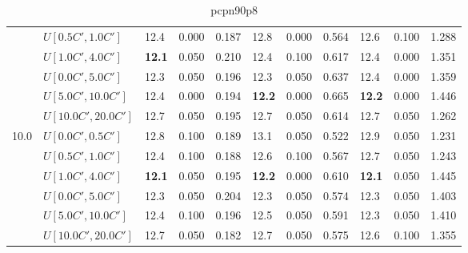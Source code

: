 \begin{table}[h]
{\begin{tabular}{|l|l||l|l|l||l|l|l||l|l|l|}
       & $U[0.5C',1.0C']$ & 12.4 & 0.000 & 0.187 & 12.8 & 0.000 & 0.564 & 12.6 & 0.100 & 1.288 \\
       & $U[1.0C',4.0C']$ & \textbf{12.1} & 0.050 & 0.210 & 12.4 & 0.100 & 0.617 & 12.4 & 0.000 & 1.351 \\
       & $U[0.0C',5.0C']$ & 12.3 & 0.050 & 0.196 & 12.3 & 0.050 & 0.637 & 12.4 & 0.000 & 1.359 \\
       & $U[5.0C',10.0C']$ & 12.4 & 0.000 & 0.194 & \textbf{12.2} & 0.000 & 0.665 & \textbf{12.2} & 0.000 & 1.446 \\
       & $U[10.0C',20.0C']$ & 12.7 & 0.050 & 0.195 & 12.7 & 0.050 & 0.614 & 12.7 & 0.050 & 1.262 \\
      \hline\hline
      \multirow{6}{*}{10.0} & $U[0.0C',0.5C']$ & 12.8 & 0.100 & 0.189 & 13.1 & 0.050 & 0.522 & 12.9 & 0.050 & 1.231 \\
       & $U[0.5C',1.0C']$ & 12.4 & 0.100 & 0.188 & 12.6 & 0.100 & 0.567 & 12.7 & 0.050 & 1.243 \\
       & $U[1.0C',4.0C']$ & \textbf{12.1} & 0.050 & 0.195 & \textbf{12.2} & 0.000 & 0.610 & \textbf{12.1} & 0.050 & 1.445 \\
       & $U[0.0C',5.0C']$ & 12.3 & 0.050 & 0.204 & 12.3 & 0.050 & 0.574 & 12.3 & 0.050 & 1.403 \\
       & $U[5.0C',10.0C']$ & 12.4 & 0.100 & 0.196 & 12.5 & 0.050 & 0.591 & 12.3 & 0.050 & 1.410 \\
       & $U[10.0C',20.0C']$ & 12.7 & 0.050 & 0.182 & 12.7 & 0.050 & 0.575 & 12.6 & 0.100 & 1.355 \\
      \hline
      \end{tabular}
      }
      \caption{pcpn90p8}
      \label{tab:pcpn90p8RecoloredTT}
      \end{table}
      


